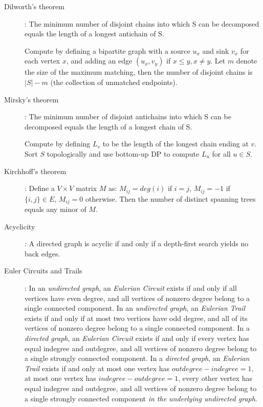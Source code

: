 \documentclass[
	a4paper,
	landscape,
	10pt,
	article
]{article}
\begin{document}
\begin{description}
	\item[Dilworth's theorem]:
		The minimum number of disjoint chains into which S can be decomposed equals the length of a longest antichain of S.

		Compute by defining a bipartite graph with a source $u_x$ and sink $v_x$ for each vertex $x$, and adding an edge $(u_x,v_y)$ if $x\leq y,x\neq y$. Let $m$ denote the size of the maximum matching, then the number of disjoint chains is $|S|-m$ (the collection of unmatched endpoints).

	\item[Mirsky's theorem]:
		The minimum number of disjoint antichains into which S can be decomposed equals the length of a longest chain of S.

		Compute by defining $L_v$ to be the length of the longest chain ending at $v$. Sort $S$ topologically and use bottom-up DP to compute $L_u$ for all $u \in S$.

	\item[Kirchhoff's theorem]:
		Define a $V \times V$ matrix $M$ as: $M_{ij}=deg(i)$ if $i=j$, $M_{ij}=-1$ if $\{i,j\} \in E$, $M_{ij}=0$ otherwise. Then the number of distinct spanning trees equals any minor of $M$.

	\item[Acyclicity]:
		A directed graph is acyclic if and only if a depth-first search yields no back edges.

	\item[Euler Circuits and Trails]:
		In an \textit{undirected graph}, an \textit{Eulerian Circuit} exists if and only if all vertices have even degree, and all vertices of nonzero degree belong to a single connected component. In an \textit{undirected graph}, an \textit{Eulerian Trail} exists if and only if at most two vertices have odd degree, and all of its vertices of nonzero degree belong to a single connected component. In a \textit{directed graph}, an \textit{Eulerian Circuit} exists if and only if every vertex has equal indegree and outdegree, and all vertices of nonzero degree belong to a single strongly connected component. In a \textit{directed graph}, an \textit{Eulerian Trail} exists if and only at most one vertex has $outdegree - indegree = 1$, at most one vertex has $indegree - outdegree = 1$, every other vertex has equal indegree and outdegree, and all vertices of nonzero degree belong to a single strongly connected component \textit{in the underlying undirected graph}.
\end{description}
\end{document}
